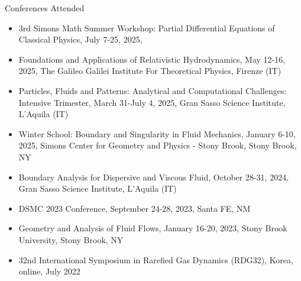 \documentclass{CV} %
\begin{document}

\begin{rSection}{Conferences Attended}
    \begin{itemize}
        \item 3rd Simons Math Summer Workshop: Partial Differential Equations of Classical Physics, July 7-25, 2025, 
        \item Foundations and Applications of Relativistic Hydrodynamics, May 12-16, 2025, The Galileo Galilei Institute For Theoretical Physics, Firenze (IT)
        \item Particles, Fluids and Patterns: Analytical and Computational Challenges: Intensive Trimester, March 31-July 4, 2025, Gran Sasso Science Institute, L'Aquila (IT)
        \item Winter School: Boundary and Singularity in Fluid Mechanics, January 6-10, 2025, Simons Center for Geometry and Physics - Stony Brook, Stony Brook, NY
        \item Boundary Analysis for Dispersive and Viscous Fluid, October 28-31, 2024, Gran Sasso Science Institute, L'Aquila (IT)
        \item DSMC 2023 Conference, September 24-28, 2023, Santa FE, NM
        \item Geometry and Analysis of Fluid Flows, January 16-20, 2023, Stony Brook University, Stony Brook, NY
        \item 32nd International Symposium in Rarefied Gas Dynamics (RDG32), Korea, online, July 2022 
    \end{itemize}
    
\end{rSection}
\end{document}
